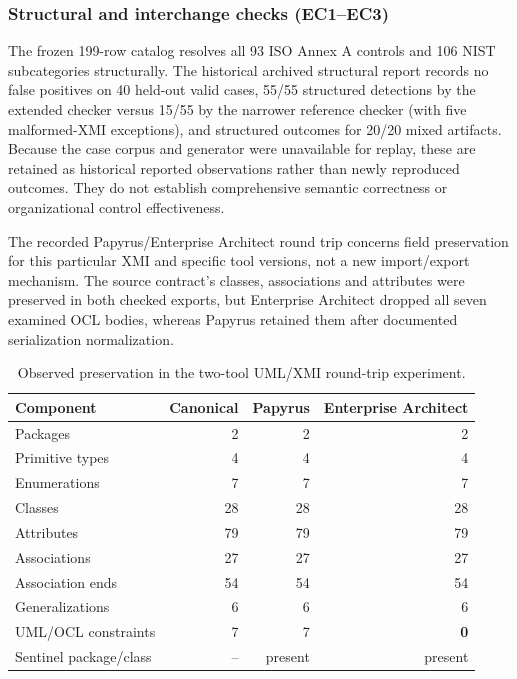 \documentclass[12pt,a4paper]{article}
\begin{document}
\subsubsection{Structural and interchange checks (EC1--EC3)}
\label{sec:structural-results}
The frozen 199-row catalog resolves all 93 ISO Annex A controls and 106 NIST subcategories structurally. The historical archived structural report records no false positives on 40 held-out valid cases, 55/55 structured detections by the extended checker versus 15/55 by the narrower reference checker (with five malformed-XMI exceptions), and structured outcomes for 20/20 mixed artifacts. Because the case corpus and generator were unavailable for replay, these are retained as historical reported observations rather than newly reproduced outcomes. They do not establish comprehensive semantic correctness or organizational control effectiveness.

The recorded Papyrus/Enterprise Architect round trip concerns field preservation for this particular XMI and specific tool versions, not a new import/export mechanism. The source contract's classes, associations and attributes were preserved in both checked exports, but Enterprise Architect dropped all seven examined OCL bodies, whereas Papyrus retained them after documented serialization normalization.

\begin{table}[H]
\centering
\caption{Observed preservation in the two-tool UML/XMI round-trip experiment.}
\label{tab:uml-roundtrip-results}
\small
\setlength{\tabcolsep}{4pt}
\begin{tabular}{@{}lrrr@{}}
\toprule
Component & Canonical & Papyrus & Enterprise Architect \\
\midrule
Packages & 2 & 2 & 2 \\
Primitive types & 4 & 4 & 4 \\
Enumerations & 7 & 7 & 7 \\
Classes & 28 & 28 & 28 \\
Attributes & 79 & 79 & 79 \\
Associations & 27 & 27 & 27 \\
Association ends & 54 & 54 & 54 \\
Generalizations & 6 & 6 & 6 \\
UML/OCL constraints & 7 & 7 & \textbf{0} \\
Sentinel package/class & -- & present & present \\
\bottomrule
\end{tabular}
\end{table}
\end{document}
